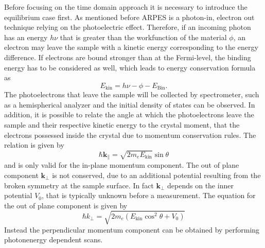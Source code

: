 Before focusing on the time domain approach it is necessary to introduce the equilibrium case first.
As mentioned before ARPES is a photon-in, electron out technique relying on the photoelectric effect.
Therefore, if an incoming photon has an energy $h\nu$ that is greater than the workfunction of the material $\phi$, an electron may leave the sample with a kinetic energy corresponding to the energy difference.
If electrons are bound stronger than at the Fermi-level, the binding energy has to be considered as well, which leads to energy conservation formula as
\begin{equation}
	E_\text{kin} = h\nu - \phi - E_\text{Bin}.
\end{equation}
The photoelectrons that leave the sample will be collected by spectrometer, such as a hemispherical analyzer and the initial density of states can be observed.
In addition, it is possible to relate the angle at which the photoelectrons leave the sample and their respective kinetic energy to the crystal moment, that the electrons possessed inside the crystal due to momentum conservation rules.
The relation is given by
\begin{equation}
	\hbar \mathbf{k}_\parallel = \sqrt{2m_eE_\text{kin}} \sin\theta
\end{equation}
and is only valid for the in-plane momentum component.
The out of plane component $\mathbf{k}_\perp$ is not conserved, due to an additional potential resulting from the broken symmetry at the sample surface.
In fact $\mathbf{k}_\perp$ depends on the inner potential $V_0$, that is typically unknown before a measurement.
The equation for the out of plane component is given by
\begin{equation}
	\hbar k_\perp = \sqrt{2m_e(E_\text{kin}\cos^2\theta+V_0)}
\end{equation}
Instead the perpendicular momentum component can be obtained by performing photonenergy dependent scans.

